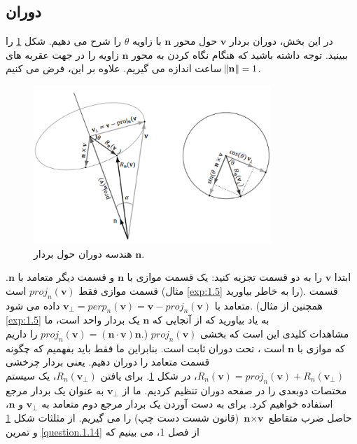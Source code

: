 \subsection{\textbf{دوران}}
\label{subsec:3.1.4}
{
    \Large
    \begin{spacing}{1.5}
        در این بخش، دوران بردار $\textbf{v}$ حول محور $\textbf{n}$ با زاویه $\theta$ را شرح می دهیم.
        شکل \ref{fig:4.Session.1.3.3} را ببینید.
        توجه داشته باشید که هنگام نگاه کردن به محور $\textbf{n}$ زاویه را در جهت عقربه های ساعت اندازه می گیریم.
        علاوه بر این، فرض می کنیم $\norm{\textbf{n}}=1$.

        \begin{figure}[H]
            \centering
            \setlength{\belowcaptionskip}{-10pt}
            \includegraphics[width=0.8\textwidth]{Images/4/3/4.Session.1.3.3}
            \caption {هندسه دوران حول بردار $\textbf{n}$.}
            \label{fig:4.Session.1.3.3}
        \end{figure}

        ابتدا $\textbf{v}$ را به دو قسمت تجزیه کنید:
        یک قسمت موازی با $\textbf{n}$ و قسمت دیگر متعامد با $\textbf{n}$.
        قسمت موازی فقط $proj_{n}(\textbf{v})$ است (مثال \ref{exp:1.5} را به خاطر بیاورید).
        قسمت متعامد با $\textbf{v}_{\perp}=perp_{n}(\textbf{v})=\textbf{v}-proj_{n}(\textbf{v})$ داده می شود.
        (همچنین از مثال \ref{exp:1.5} به یاد بیاورید که از آنجایی که $\textbf{n}$ یک بردار واحد است، ما $proj_{n}(\textbf{v})= (\textbf{n}\cdot\textbf{v})\textbf{n}$ را داریم.)
        مشاهدات کلیدی این است که بخشی $proj_{n}(\textbf{v})$ که موازی با $\textbf{n}$ است ، تحت دوران ثابت است.
        بنابراین ما فقط باید بفهمیم که چگونه قسمت متعامد را دوران دهیم. یعنی بردار چرخشی $R_{n}(\textbf{v})=proj_{n}(\textbf{v})+R_{n}(\textbf{v}_{\perp})$، در شکل \ref{fig:4.Session.1.3.3}.
        برای یافتن $R_{n}(\textbf{v}_{\perp})$، یک سیستم مختصات دوبعدی را در صفحه دوران تنظیم کردیم.
        ما از $\textbf{v}_{\perp}$ به عنوان یک بردار مرجع استفاده خواهیم کرد.
        برای به دست آوردن یک بردار مرجع دوم متعامد به $\textbf{v}_{\perp}$ و $\textbf{n}$،
        حاصل ضرب متقاطع $\textbf{n}\times\textbf{v}$ (قانون شست دست چپ) را می گیریم. از مثلثات شکل \ref{fig:4.Session.1.3.3} و تمرین \ref{question.1.14} از فصل 1، می بینیم که


\end{spacing}}
